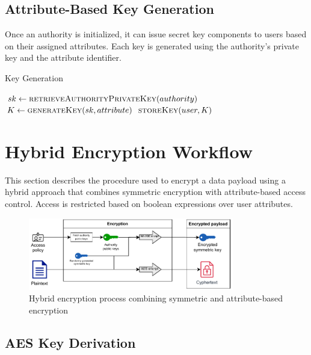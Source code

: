 \documentclass[cic,tc,english]{iiufrgs}
\begin{document}
        \subsection{Attribute-Based Key Generation}
            Once an authority is initialized, it can issue secret key components to users based on their assigned attributes. Each key is generated using the authority's private key and the attribute identifier.

            \begin{algorithm}
                \caption{Key Generation}
                \label{alg:keygen}
                \begin{algorithmic}[1]
                    \State $sk \gets \textsc{retrieveAuthorityPrivateKey}(authority)$
                    \State $K \gets \textsc{generateKey}(sk, attribute)$
                    \State $\textsc{storeKey}(user, K)$
                \EndProcedure
                \end{algorithmic}
            \end{algorithm}

    \section{Hybrid Encryption Workflow}
    \label{sec:encryption-workflow}
        This section describes the procedure used to encrypt a data payload using a hybrid approach that combines symmetric encryption with attribute-based access control. Access is restricted based on boolean expressions over user attributes.

        \begin{figure}
            \centering
            \includegraphics[width=0.8\textwidth]{images/diagrams/encryption_diagram}
            \caption{Hybrid encryption process combining symmetric and attribute-based encryption}
            \label{fig:encryption_diagram}
        \end{figure}


        \subsection{AES Key Derivation}
\end{document}

